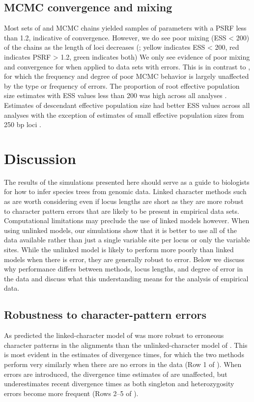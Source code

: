 \subsection{MCMC convergence and mixing}
Most sets of \beast and \ecoevolity MCMC chains yielded samples of parameters with
a PSRF less than 1.2, indicative of convergence.
However, we do see poor mixing (ESS < 200) of the \beast chains as the length
of loci decreases (\mainfigs;
yellow indicates ESS < 200, red indicates PSRF > 1.2, green indicates both)
We only see evidence of poor mixing and convergence for \ecoevolity when
applied to data sets with errors.
This is in contrast to \beast, for which the frequency and degree of poor MCMC
behavior is largely unaffected by the type or frequency of errors.
The proportion of \beast root effective population size estimates with ESS 
values less than 200 was high across all analyses \rootfigsp.
Estimates of descendant effective population size had better ESS values across all 
analyses with the exception of estimates of small effective population sizes from 
250 bp loci \thetafigsp.


\section{Discussion}

The results of the simulations presented here should serve as a guide to 
biologists for how to infer species trees from genomic data. 
Linked character methods such as \beast are worth considering even if locus lengths
are short as they are more robust to character pattern errors that are likely 
to be present in empirical data sets. Computational limitations may preclude the 
use of linked models however. When using unlinked models, our simulations 
show that it is better to use all of the data available rather than just a single 
variable site per locus or only the variable sites. While the unlinked model is 
likely to perform more poorly than linked models when there is error, they are 
generally robust to error. Below we discuss why performance differs between 
methods, locus lengths, and degree of error in the data and discuss what this 
understanding means for the analysis of empirical data. 

\subsection{Robustness to character-pattern errors}
As predicted the linked-character model of \beast was more robust to erroneous
character patterns in the alignments than the unlinked-character model of
\ecoevolity.
This is most evident in the estimates of divergence times, for which
the two methods perform very similarly when there are no errors in the
data (Row 1 of \timefigs).
When errors are introduced, the divergence time estimates of \beast are
unaffected, but \ecoevolity underestimates recent divergence times as both
singleton and heterozygosity errors become more frequent (Rows 2--5 of
\timefigs). 


